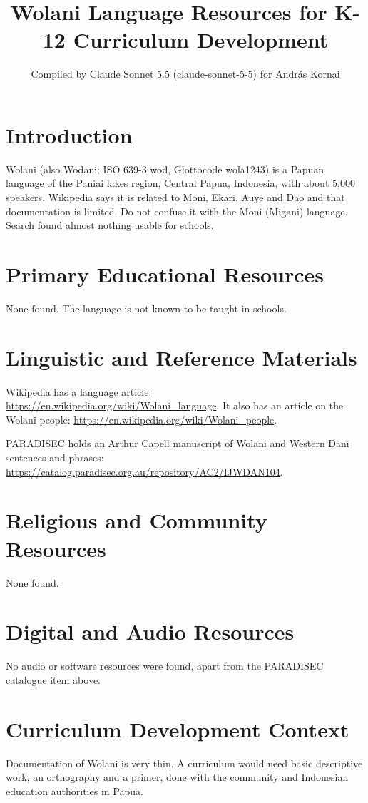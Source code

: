 \documentclass[12pt]{article}
\title{Wolani Language Resources for K-12 Curriculum Development}
\author{Compiled by Claude Sonnet 5.5 (claude-sonnet-5-5) for Andr\'as Kornai}
\date{}
\begin{document}
\maketitle

\section{Introduction}
Wolani (also Wodani; ISO 639-3 wod, Glottocode wola1243) is a Papuan language of the Paniai lakes region, Central Papua, Indonesia, with about 5{,}000 speakers. Wikipedia says it is related to Moni, Ekari, Auye and Dao and that documentation is limited. Do not confuse it with the Moni (Migani) language. Search found almost nothing usable for schools.

\section{Primary Educational Resources}
None found. The language is not known to be taught in schools.

\section{Linguistic and Reference Materials}
Wikipedia has a language article: \url{https://en.wikipedia.org/wiki/Wolani_language}. It also has an article on the Wolani people: \url{https://en.wikipedia.org/wiki/Wolani_people}.

PARADISEC holds an Arthur Capell manuscript of Wolani and Western Dani sentences and phrases: \url{https://catalog.paradisec.org.au/repository/AC2/IJWDAN104}.

\section{Religious and Community Resources}
None found.

\section{Digital and Audio Resources}
No audio or software resources were found, apart from the PARADISEC catalogue item above.

\section{Curriculum Development Context}
Documentation of Wolani is very thin. A curriculum would need basic descriptive work, an orthography and a primer, done with the community and Indonesian education authorities in Papua.
\end{document}
